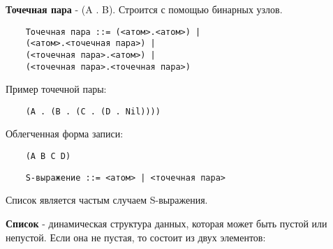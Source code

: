 \textbf{Точечная пара} - (A . B). Строится с помощью бинарных узлов.   

\begin{lstlisting}
	Точечная пара ::= (<атом>.<атом>) |
	(<атом>.<точечная пара>) |
	(<точечная пара>.<атом>) |
	(<точечная пара>.<точечная пара>)	
\end{lstlisting}

Пример точечной пары:
\begin{lstlisting}
	(A . (B . (C . (D . Nil))))
\end{lstlisting}
Облегченная форма записи:
\begin{lstlisting}
	(A B C D)
\end{lstlisting}




\begin{lstlisting}
	S-выражение ::= <атом> | <точечная пара>
\end{lstlisting}

Список является частым случаем S-выражения.



\textbf{Список} - динамическая структура данных, которая может быть
пустой или непустой. Если она не пустая, то состоит из двух элементов:

